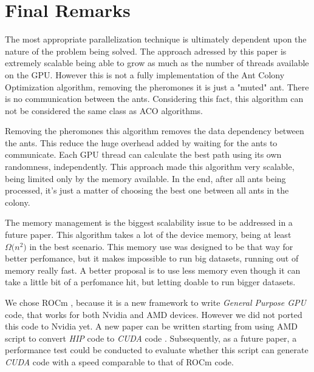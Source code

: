 \section{Final Remarks}

The most appropriate parallelization technique is ultimately dependent upon the
nature of the problem being solved. The approach adressed by this paper
is extremely scalable being able to grow as much as the number of threads available on the GPU.
However this is not a fully implementation of the Ant Colony Optimization algorithm,
removing the pheromones it is just a "muted" ant. There is no communication between the ants.
Considering this fact, this algorithm can not be considered the same class as
ACO algorithms.

Removing the pheromones this algorithm removes the data dependency between the ants.
This reduce the huge overhead added by waiting for the ants to communicate. Each GPU
thread can calculate the best path using its own randomness, independently. This approach made this algorithm
very scalable, being limited only by the memory available. In the end, after all ants
being processed, it's just a matter of choosing the best one between all ants in the colony.

The memory management is the biggest scalability issue to be addressed in a future paper. This algorithm
takes a lot of the device memory, being at least $\Omega({n^{2})}$ in the best scenario.
This memory use was designed to be that way for better perfomance, but it makes impossible to run big datasets, running out
of memory really fast. A better proposal is to use less memory even though it can take a little bit of a perfomance hit, but
letting doable to run bigger datasets.

We chose ROCm \cite{rocm}, because it is a new framework to write \emph{General Purpose GPU} code, that
works for both Nvidia and AMD devices. However we did not ported this code to Nvidia yet. A new paper can be
written starting from using AMD script to convert \emph{HIP} code to \emph{CUDA}
code \cite{hipifyamd}. Subsequently, as a future paper, a performance test could be conducted to evaluate whether this
script can generate \emph{CUDA} code with a speed comparable to that of ROCm code.
